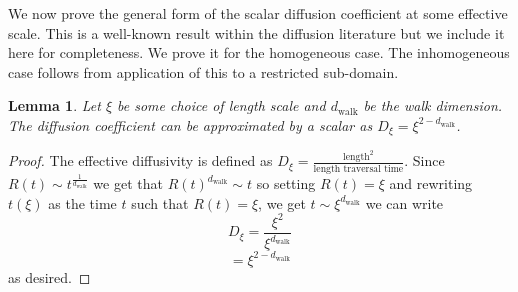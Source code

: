 \documentclass{article} %
\newtheorem{lemma}{Lemma}[section]
\theoremstyle{definition}
\begin{document}
We now prove the general form of the scalar diffusion coefficient at some effective scale. This is a well-known result within the diffusion literature \citep{BOUCHAUD1990127} but we include it here for completeness. We prove it for the homogeneous case. The inhomogeneous case follows from application of this to a restricted sub-domain.
\begin{lemma}
    Let $\xi$ be some choice of length scale and $d_{\text{walk}}$ be the walk dimension. The diffusion coefficient can be approximated by a scalar as $D_\xi = \xi^{2-d_{\text{walk}}}$.
\end{lemma}
\begin{proof}
    The effective diffusivity is defined as $D_\xi = \frac{\text{length}^2}{\text{length traversal time}}$. Since $R(t) \sim t^{\frac{1}{d_{\text{walk}}}}$ we get that $R(t)^{d_{\text{walk}}} \sim t$ so setting $R(t) = \xi$ and rewriting $t(\xi)$ as the time $t$ such that $R(t) = \xi$, we get $t \sim \xi^{d_{\text{walk}}}$ we can write
    \begin{equation}
        D_\xi = \frac{\xi^2}{\xi^{d_{\text{walk}}}}
    \end{equation}
    \begin{equation}
        =\xi^{2-d_{\text{walk}}}
    \end{equation}
    as desired.
\end{proof}
\end{document}
